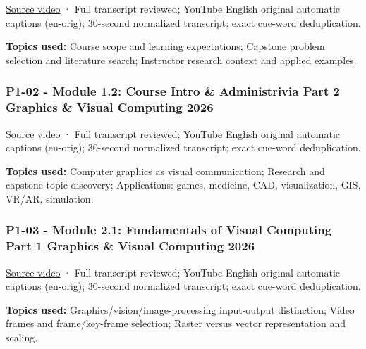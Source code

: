\hypertarget{04-visual-computing-ii-ch036-p1-01---module-1.1-course-intro-administrivia-part-1-graphics-visual-computing-2026}{}

\href{https://www.youtube.com/watch?v=dA0O3xbMhZw}{Source video} · Full transcript reviewed; YouTube English original automatic captions (en-orig); 30-second normalized transcript; exact cue-word deduplication.

\textbf{Topics used:} Course scope and learning expectations; Capstone problem selection and literature search; Instructor research context and applied examples.

\subsubsection{P1-02 - Module 1.2: Course Intro \& Administrivia Part 2 Graphics \& Visual Computing 2026}\label{04-visual-computing-ii-ch036-p1-02---module-1.2-course-intro-administrivia-part-2-graphics-visual-computing-2026}

\hypertarget{04-visual-computing-ii-ch036-p1-02---module-1.2-course-intro-administrivia-part-2-graphics-visual-computing-2026}{}

\href{https://www.youtube.com/watch?v=SAqv-gqy0tA}{Source video} · Full transcript reviewed; YouTube English original automatic captions (en-orig); 30-second normalized transcript; exact cue-word deduplication.

\textbf{Topics used:} Computer graphics as visual communication; Research and capstone topic discovery; Applications: games, medicine, CAD, visualization, GIS, VR/AR, simulation.

\subsubsection{P1-03 - Module 2.1: Fundamentals of Visual Computing Part 1 Graphics \& Visual Computing 2026}\label{04-visual-computing-ii-ch036-p1-03---module-2.1-fundamentals-of-visual-computing-part-1-graphics-visual-computing-2026}

\hypertarget{04-visual-computing-ii-ch036-p1-03---module-2.1-fundamentals-of-visual-computing-part-1-graphics-visual-computing-2026}{}

\href{https://www.youtube.com/watch?v=hoZcPvCIFyk}{Source video} · Full transcript reviewed; YouTube English original automatic captions (en-orig); 30-second normalized transcript; exact cue-word deduplication.

\textbf{Topics used:} Graphics/vision/image-processing input-output distinction; Video frames and frame/key-frame selection; Raster versus vector representation and scaling.

